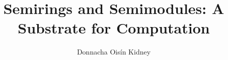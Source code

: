 
\title{Semirings and Semimodules: A Substrate for Computation}
\author{Donnacha Oisín Kidney}

\maketitle
\listoftodos
\tableofcontents








